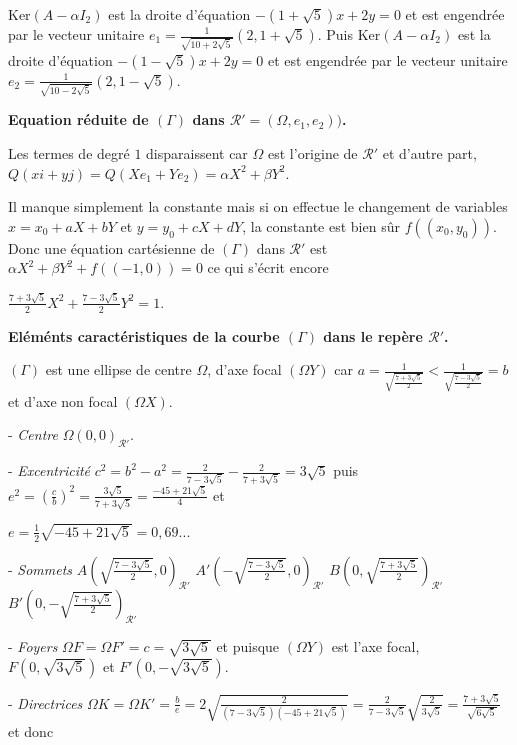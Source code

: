 {\begin{enumerate}
{$\text{Ker}(A-\alpha I_2)$ est la droite d'équation $-(1+\sqrt{5})x + 2y=0$ et est engendrée par le vecteur unitaire $e_1=\frac{1}{\sqrt{10+2\sqrt{5}}}(2,1+\sqrt{5})$. Puis $\text{Ker}(A-\alpha I_2)$ est la droite d'équation $-(1-\sqrt{5})x + 2y=0$ et est engendrée par le vecteur unitaire $e_2=\frac{1}{\sqrt{10-2\sqrt{5}}}(2,1-\sqrt{5})$.

\textbf{Equation réduite de $(\Gamma)$ dans $\mathcal{R}'=(\Omega,e_1,e_2))$.}

Les termes de degré $1$ disparaissent car $\Omega$ est l'origine de $\mathcal{R}'$ et d'autre part, $Q(xi+yj) = Q(Xe_1+Ye_2) =\alpha X^2+\beta Y^2$.

Il manque simplement la constante mais si on effectue le changement de variables $x = x_0+aX+bY$ et $y = y_0+cX+dY$, la constante est bien sûr $f((x_0,y_0))$. Donc une équation cartésienne de $(\Gamma)$ dans $\mathcal{R}'$ est $\alpha X^2+\beta Y^2+f((-1,0))= 0$ ce qui s'écrit encore

\begin{center}
$\frac{7+3\sqrt{5}}{2}X^2+\frac{7-3\sqrt{5}}{2}Y^2 = 1$.
\end{center}

\textbf{Eléménts caractéristiques de la courbe $(\Gamma)$ dans le repère $\mathcal{R}'$.}

$(\Gamma)$ est une ellipse de centre $\Omega$, d'axe focal $(\Omega Y)$ car $a=\frac{1}{\sqrt{\frac{7+3\sqrt{5}}{2}}}<\frac{1}{\sqrt{\frac{7-3\sqrt{5}}{2}}}=b$ et d'axe non focal $(\Omega X)$.

- \emph{Centre} $\Omega(0,0)_{\mathcal{R}'}$.
 
 
- \emph{Excentricité} $c^2=b^2-a^2 =\frac{2}{7-3\sqrt{5}}-\frac{2}{7+3\sqrt{5}}=3\sqrt{5}$ puis $e^2 =\left(\frac{c}{b}\right)^2=\frac{3\sqrt{5}}{7+3\sqrt{5}}=\frac{-45+21\sqrt{5}}{4}$ et 

$e=\frac{1}{2}\sqrt{-45+21\sqrt{5}}= 0,69...$
 
- \emph{Sommets} $A\left(\sqrt{\frac{7-3\sqrt{5}}{2}},0\right)_{\mathcal{R}'}$  $A'\left(-\sqrt{\frac{7-3\sqrt{5}}{2}},0\right)_{\mathcal{R}'}$  $B\left(0,\sqrt{\frac{7+3\sqrt{5}}{2}}\right)_{\mathcal{R}'}$  $B'\left(0,-\sqrt{\frac{7+3\sqrt{5}}{2}}\right)_{\mathcal{R}'}$ 

- \emph{Foyers} $\Omega F =\Omega F'=c=\sqrt{3\sqrt{5}}$  et puisque $(\Omega Y)$ est l'axe focal, $F(0,\sqrt{3\sqrt{5}})$ et $F'(0,-\sqrt{3\sqrt{5}})$. 

- \emph{Directrices} $\Omega K =\Omega K'=\frac{b}{e}=2\sqrt{\frac{2}{(7-3\sqrt{5})(-45+21\sqrt{5})}}=\frac{2}{7-3\sqrt{5}}\sqrt{\frac{2}{3\sqrt{5}}}=\frac{7+3\sqrt{5}}{\sqrt{6\sqrt{5}}}$ et donc 

}
\end{enumerate}}
